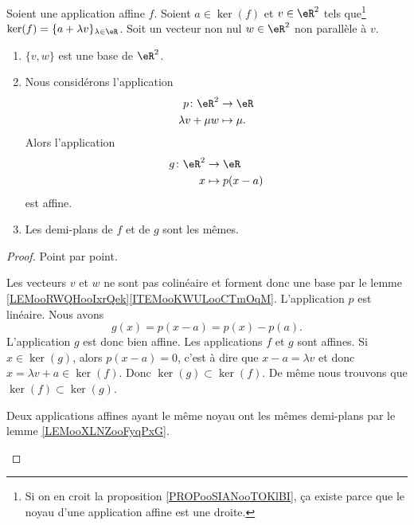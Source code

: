 \begin{lemma}        \label{LEMooBWFSooBkIcOg}
    Soient une application affine \( f\). Soient \( a\in\ker(f)\) et \( v\in \eR^2\) tels que\footnote{Si on en croit la proposition \ref{PROPooSIANooTOKlBI}, ça existe parce que le noyau d'une application affine est une droite.} \( \ker(f)=\{ a+\lambda v \}_{\lambda\in \eR}\). Soit un vecteur non nul \( w\in \eR^2\) non parallèle à \( v\).
    \begin{enumerate}
        \item       \label{ITEMooYDYPooRzupcO}
            \( \{ v,w \}\) est une base de \( \eR^2\).
        \item       \label{ITEMooHKVWooLAEMTm}
            Nous considérons l'application
            \begin{equation}
                \begin{aligned}
                    p\colon \eR^2&\to \eR \\
                    \lambda v+\mu w&\mapsto  \mu.
                \end{aligned}
            \end{equation}
            Alors l'application
            \begin{equation}
                \begin{aligned}
                    g\colon \eR^2&\to \eR \\
                    x&\mapsto p(x-a) 
                \end{aligned}
            \end{equation}
            est affine.
        \item       \label{ITEMooGRZGooMFQPjM}
            Les demi-plans de \( f\) et de \( g\) sont les mêmes.
    \end{enumerate}
\end{lemma}

\begin{proof}
    Point par point.
    \begin{subproof}
        Les vecteurs \( v\) et \( w\) ne sont pas colinéaire et forment donc une base par le lemme \ref{LEMooRWQHooIxrQek}\ref{ITEMooKWULooCTmOqM}.
        L'application \( p\) est linéaire. Nous avons
        \begin{equation}
            g(x)=p(x-a)=p(x)-p(a).
        \end{equation}
        L'application \( g\) est donc bien affine.
        Les applications \( f\) et \( g\) sont affines. Si \( x\in\ker(g)\), alors \( p(x-a)=0\), c'est à dire que \( x-a=\lambda v\) et donc \( x=\lambda v+a\in \ker(f)\). Donc \( \ker(g)\subset\ker(f)\). De même nous trouvons que \( \ker(f)\subset\ker(g)\).

        Deux applications affines ayant le même noyau ont les mêmes demi-plans par le lemme \ref{LEMooXLNZooFyqPxG}.
    \end{subproof}
\end{proof}

